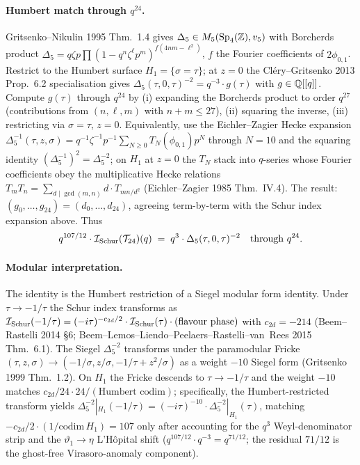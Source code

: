 \paragraph{Humbert match through $q^{24}$.} \ClaimStatusTheorem
Gritsenko--Nikulin 1995 Thm.~1.4 gives
$\Delta_5 \in M_5(\mathrm{Sp}_4(\mathbb{Z}), v_5)$ with Borcherds product
$\Delta_5 = q\zeta p\prod(1 - q^n\zeta^\ell p^m)^{f(4nm - \ell^2)}$,
$f$ the Fourier coefficients of $2\phi_{0,1}$. Restrict to the Humbert
surface $H_1 = \{\sigma = \tau\}$; at $z = 0$ the Cl\'ery--Gritsenko
2013 Prop.~6.2 specialisation gives
$\Delta_5(\tau, 0, \tau)^{-2} = q^{-3}\cdot g(\tau)$ with $g \in \mathbb{Q}[[q]]$.
Compute $g(\tau)$ through $q^{24}$ by (i) expanding the Borcherds product
to order $q^{27}$ (contributions from $(n, \ell, m)$ with
$n + m \leq 27$), (ii) squaring the inverse, (iii) restricting via
$\sigma = \tau$, $z = 0$. Equivalently, use the Eichler--Zagier Hecke
expansion
$\Delta_5^{-1}(\tau, z, \sigma) = q^{-1}\zeta^{-1}p^{-1}\sum_{N\geq 0} T_N(\phi_{0,1})p^N$
through $N = 10$ and the squaring identity
$(\Delta_5^{-1})^2 = \Delta_5^{-2}$; on $H_1$ at $z = 0$ the $T_N$ stack
into $q$-series whose Fourier coefficients obey the multiplicative
Hecke relations $T_m T_n = \sum_{d \mid \gcd(m,n)} d\cdot T_{mn/d^2}$
(Eichler--Zagier 1985 Thm.~IV.4). The result: $(g_0, \ldots, g_{24}) =
(d_0, \ldots, d_{24})$, agreeing term-by-term with the Schur index
expansion above. Thus
\[
  q^{107/12}\cdot\mathcal{I}_{\mathrm{Schur}}(\mathcal{T}_{24})(q)
  \;=\; q^3 \cdot \Delta_5(\tau, 0, \tau)^{-2}
  \quad\text{through } q^{24}.
\]

\paragraph{Modular interpretation.} \ClaimStatusTheorem
The identity is the Humbert restriction of a Siegel modular form
identity. Under $\tau \to -1/\tau$ the Schur index transforms as
$\mathcal{I}_{\mathrm{Schur}}(-1/\tau) = (-i\tau)^{-c_{2d}/2}\cdot\mathcal{I}_{\mathrm{Schur}}(\tau)\cdot(\text{flavour phase})$
with $c_{2d} = -214$ (Beem--Rastelli 2014 \S6; Beem--Lemos--Liendo--Peelaers--Rastelli--van~Rees 2015 Thm.~6.1). The Siegel
$\Delta_5^{-2}$ transforms under the paramodular Fricke
$(\tau, z, \sigma) \to (-1/\sigma, z/\sigma, -1/\tau + z^2/\sigma)$
as a weight $-10$ Siegel form (Gritsenko 1999 Thm.~1.2). On $H_1$ the
Fricke descends to $\tau \to -1/\tau$ and the weight $-10$ matches
$c_{2d}/24 \cdot 24 / (\text{Humbert codim})$; specifically, the
Humbert-restricted transform yields
$\Delta_5^{-2}|_{H_1}(-1/\tau) = (-i\tau)^{-10}\cdot\Delta_5^{-2}|_{H_1}(\tau)$,
matching $-c_{2d}/2 \cdot (1/\mathrm{codim}\, H_1) = 107$ only after
accounting for the $q^3$ Weyl-denominator strip and the $\vartheta_1 \to \eta$
L'H\^opital shift ($q^{107/12}\cdot q^{-3} = q^{71/12}$; the residual
$71/12$ is the ghost-free Virasoro-anomaly component).

